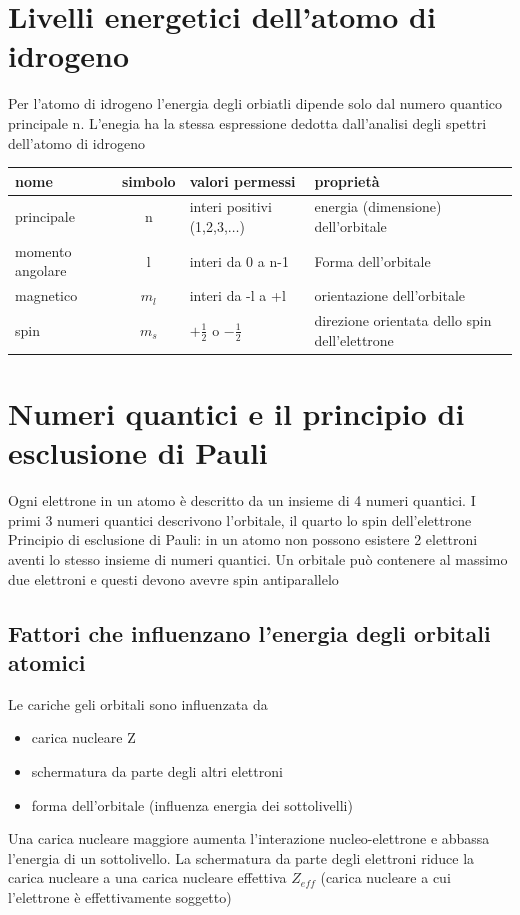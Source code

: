 \documentclass[a4paper,11pt]{report}
\begin{document}
\section{Livelli energetici dell'atomo di idrogeno}

Per l'atomo di idrogeno l'energia degli orbiatli dipende solo dal numero quantico principale n. 
L'enegia ha la stessa espressione dedotta dall'analisi degli spettri dell'atomo di idrogeno

\begin{center}
	\begin{tabular}{lcll}
		nome & simbolo & valori permessi & proprietà \\
		\hline
		principale & n & interi positivi (1,2,3,$\dots$) & energia (dimensione) dell'orbitale \\
		momento angolare & l & interi da 0 a n-1 & Forma dell'orbitale \\
		magnetico & $m_l$ & interi da -l a +l & orientazione dell'orbitale \\
		spin & $m_s$ & $+\frac{1}{2}$ o $-\frac{1}{2}$ & direzione orientata dello spin dell'elettrone \\
		\hline
	\end{tabular}
\end{center}

\section{Numeri quantici e il principio di esclusione di Pauli}

Ogni elettrone in un atomo è descritto da un insieme di 4 numeri quantici. 
I primi 3 numeri quantici descrivono l'orbitale, il quarto lo spin dell'elettrone \newline
Principio di esclusione di Pauli: in un atomo non possono esistere 2 elettroni aventi lo stesso insieme di numeri quantici. 
Un orbitale può contenere al massimo due elettroni e questi devono avevre spin antiparallelo

\subsection*{Fattori che influenzano l'energia degli orbitali atomici}

Le cariche geli orbitali sono influenzata da 
	\begin{itemize}
		\item carica nucleare Z
		\item schermatura da parte degli altri elettroni
		\item forma dell'orbitale (influenza energia dei sottolivelli)
	\end{itemize}
Una carica nucleare maggiore aumenta l'interazione nucleo-elettrone e abbassa l'energia di un sottolivello.
La schermatura da parte degli elettroni riduce la carica nucleare a una carica nucleare effettiva $Z_{eff}$ (carica nucleare a cui l'elettrone è effettivamente soggetto)
\end{document}
